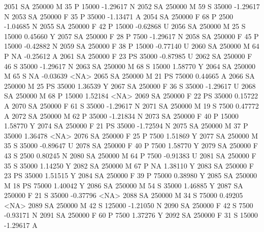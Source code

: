 \documentclass{article}
\begin{document}
\begin{Schunk}
\begin{Soutput}
2051     SA     250000   M  35         P  15000  -1.29617    N
2052     SA     250000   M  59         S  35000  -1.29617    N
2053     SA     250000   F  35         P  35000  -1.13471    A
2054     SA     250000   F  68         P   2500  -1.04685    N
2055     SA     250000   F  42         P  15000  -0.62868    U
2056     SA     250000   M  25         S  15000   0.45660    Y
2057     SA     250000   F  28         P   7500  -1.29617    N
2058     SA     250000   F  45         P  15000  -0.42882    N
2059     SA     250000   F  38         P  15000  -0.77140    U
2060     SA     250000   M  64         P     NA  -0.25612    A
2061     SA     250000   F  23        PS  35000  -0.87985    U
2062     SA     250000   F  46         S  35000  -1.29617    N
2063     SA     250000   M  68         S  15000   1.58770    Y
2064     SA     250000   M  65         S     NA  -0.03639 <NA>
2065     SA     250000   M  21        PS  75000   0.44665    A
2066     SA     250000   M  25        PS  35000   1.36539    Y
2067     SA     250000   F  36         S  35000  -1.29617    U
2068     SA     250000   M  68         P  15000   1.52184 <NA>
2069     SA     250000   F  22        PS  35000   0.15722    A
2070     SA     250000   F  61         S  35000  -1.29617    N
2071     SA     250000   M  19         S   7500   0.47772    A
2072     SA     250000   M  62         P  35000  -1.21834    N
2073     SA     250000   F  40         P  15000   1.58770    Y
2074     SA     250000   F  21        PS  35000  -1.72594    N
2075     SA     250000   M  37         P  35000   1.36478 <NA>
2076     SA     250000   F  25         P   7500   1.51869    Y
2077     SA     250000   M  35         S  35000  -0.89647    U
2078     SA     250000   F  40         P   7500   1.58770    Y
2079     SA     250000   F  43         S   2500   0.80245    N
2080     SA     250000   M  64         P   7500  -0.91383    U
2081     SA     250000   F  35         S  35000   1.14250    Y
2082     SA     250000   M  67         P     NA   1.38110    Y
2083     SA     250000   F  23        PS  35000   1.51515    Y
2084     SA     250000   F  39         P  75000   0.38980    Y
2085     SA     250000   M  18        PS  75000   1.40042    Y
2086     SA     250000   M  54         S  35000   1.46885    Y
2087     SA     250000   F  21         S  35000  -0.37796 <NA>
2088     SA     250000   M  34         S  75000   0.49205 <NA>
2089     SA     250000   M  42         S 125000  -1.21050    N
2090     SA     250000   F  42         S   7500  -0.93171    N
2091     SA     250000   F  60         P   7500   1.37276    Y
2092     SA     250000   F  31         S  15000  -1.29617    A

\end{Soutput}
\end{Schunk}
\end{document}
